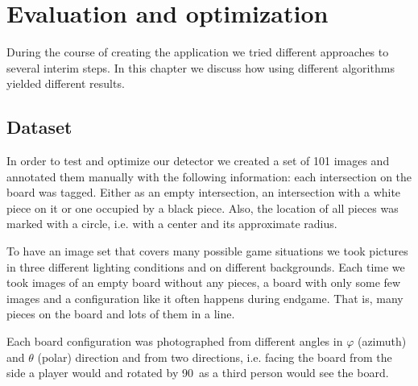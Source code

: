 
\chapter{Evaluation and optimization}
	\label{evaluation}
	During the course of creating the application we tried different approaches to several interim steps. In this chapter we discuss how using different algorithms yielded different results.

	\section{Dataset}
	\label{evaluation-dataset}
	In order to test and optimize our detector we created a set of 101 images and annotated them manually with the following information: each intersection on the board was tagged. Either as an empty intersection, an intersection with a white piece on it or one occupied by a black piece. Also, the location of all pieces was marked with a circle, i.e. with a center and its approximate radius.

	To have an image set that covers many possible game situations we took pictures in three different lighting conditions and on different backgrounds. Each time we took images of an empty board without any pieces, a board with only some few images and a configuration like it often happens during endgame. That is, many pieces on the board and lots of them in a line.

	Each board configuration was photographed from different angles in $\varphi$ (azimuth) and $\theta$ (polar) direction and from two directions, i.e. facing the board from the side a player would and rotated by 90\textdegree\ as a third person would see the board.


